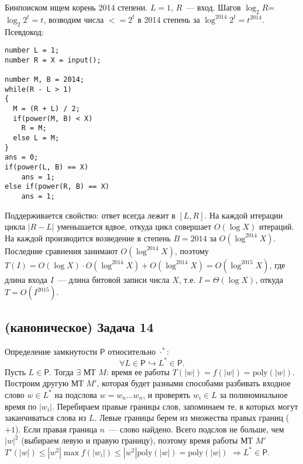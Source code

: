 \documentclass[a4paper]{article}
\def\PP{{\mathsf{P}}}
\begin{document}
Бинпоиском ищем корень 2014 степени. $L=1$, $R$~--- вход. Шагов $\log_{2} R$=$\log_2 2^t=t$, возводим числа $<= 2^t$ в 2014 степень за $\log^{2014} 2^t=t^{2014}$. Псевдокод:\newline
\begin{lstlisting}
number L = 1;
number R = X = input();

number M, B = 2014;
while(R - L > 1)
{
  M = (R + L) / 2;
  if(power(M, B) < X)
    R = M;
  else L = M;
}
ans = 0;
if(power(L, B) == X)
	ans = 1;
else if(power(R, B) == X)
	ans = 1;
\end{lstlisting}
Поддерживается свойство: ответ всегда лежит в $[L,R]$. На каждой итерации цикла $|R-L|$ уменьшается вдвое, откуда цикл совершает $O(\log X)$ итераций. На каждой производится возведение в степень $B=2014$ за $O(\log^{2014} X)$. Последние сравнения занимают $O(\log^{2014}X)$, поэтому $T(I)=O(\log X)\cdot O(\log^{2014}X)+O(\log^{2014}X)=O(\log^{2015} X)$, где длина входа $I$~--- длина битовой записи числа $X$, т.е. $I=\Theta(\log X)$, откуда $T=O(I^{2015})$.
\subsection*{(каноническое) Задача 14}
Определение замкнутости $\PP$ относительно $\cdot^*$:
$$
\forall L\in\PP\hookrightarrow L^*\in\PP.
$$
Пусть $L\in\PP$. Тогда $\exists$ МТ $M$: время ее работы $T(|w|)=f(|w|)=\mbox{poly}(|w|)$. Построим другую МТ $M'$, которая будет разными способами разбивать входное слово $w\in L^*$ на подслова $w=w_n...w_n$, и проверять $w_i\in L$ за полиномиальное время по $|w_i|$. Перебираем правые границы слов, запоминаем те, в которых могут заканчиваться слова из $L$. Левые границы берем из множества правых границ ($+1$). Если правая граница $n$~--- слово найдено.\newline
Всего подслов не больше, чем $|w|^2$ (выбираем левую и правую границу), поэтому время работы МТ $M'$\newline
$T'(|w|)\leqslant|w^2|\max f(|w_i|)\leqslant |w^2|\mbox{poly}(|w|)=\mbox{poly}(|w|)$ $\Rightarrow L^*\in \PP$.
\end{document}
